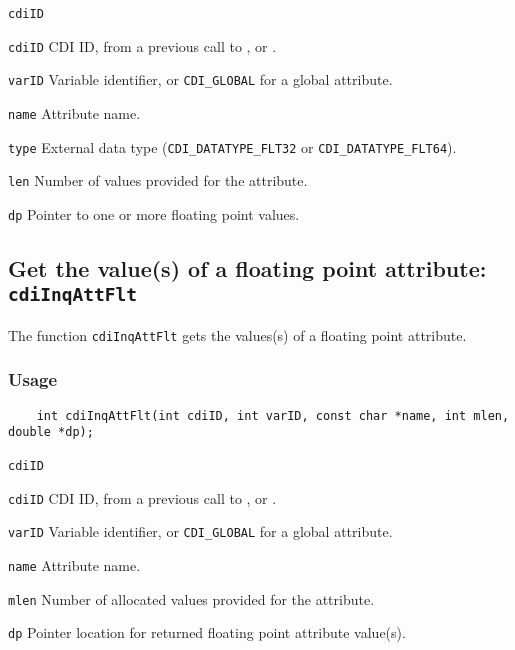 \hspace*{4mm}\begin{minipage}[]{15cm}
\begin{deflist}{\texttt{cdiID}\ }
\item[\texttt{cdiID}]
CDI ID, from a previous call to {}, {} or {}.
\item[\texttt{varID}]
Variable identifier, or {\texttt{CDI\_GLOBAL}} for a global attribute.
\item[\texttt{name}]
Attribute name.
\item[\texttt{type}]
External data type ({\texttt{CDI\_DATATYPE\_FLT32}} or {\texttt{CDI\_DATATYPE\_FLT64}}).
\item[\texttt{len}]
Number of values provided for the attribute.
\item[\texttt{dp}]
Pointer to one or more floating point values.

\end{deflist}
\end{minipage}


\subsection{Get the value(s) of a floating point attribute: \texttt{cdiInqAttFlt}}
\label{cdiInqAttFlt}

The function {\texttt{cdiInqAttFlt}} gets the values(s) of a floating point attribute.

\subsubsection*{Usage}

\begin{verbatim}
    int cdiInqAttFlt(int cdiID, int varID, const char *name, int mlen, double *dp);
\end{verbatim}

\hspace*{4mm}\begin{minipage}[]{15cm}
\begin{deflist}{\texttt{cdiID}\ }
\item[\texttt{cdiID}]
CDI ID, from a previous call to {}, {} or {}.
\item[\texttt{varID}]
Variable identifier, or {\texttt{CDI\_GLOBAL}} for a global attribute.
\item[\texttt{name}]
Attribute name.
\item[\texttt{mlen}]
Number of allocated values provided for the attribute.
\item[\texttt{dp}]
Pointer location for returned floating point attribute value(s).

\end{deflist}
\end{minipage}

